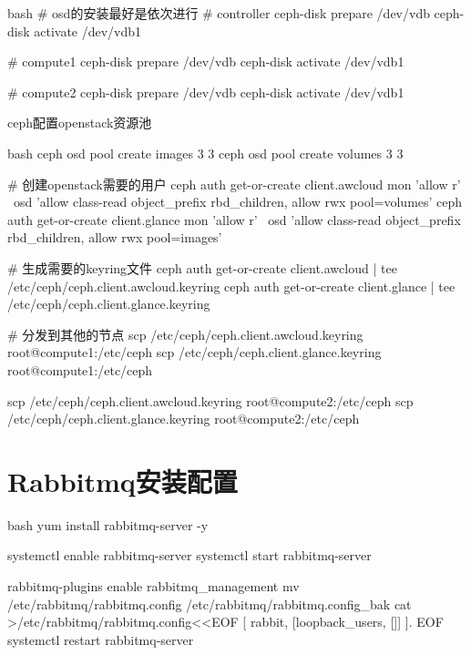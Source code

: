 \begin{outline}[enumerate]
\begin{code-in-enumerate}{bash}
# osd的安装最好是依次进行
# controller
ceph-disk prepare /dev/vdb
ceph-disk activate /dev/vdb1

# compute1
ceph-disk prepare /dev/vdb
ceph-disk activate /dev/vdb1

# compute2
ceph-disk prepare /dev/vdb
ceph-disk activate /dev/vdb1
\end{code-in-enumerate}

\1 ceph配置openstack资源池
\begin{code-in-enumerate}{bash}
ceph osd pool create images 3 3
ceph osd pool create volumes 3 3

# 创建openstack需要的用户
ceph auth get-or-create client.awcloud mon 'allow r' \
    osd 'allow class-read object_prefix rbd_children, allow rwx pool=volumes'
ceph auth get-or-create client.glance mon 'allow r' \
    osd 'allow class-read object_prefix rbd_children, allow rwx pool=images'

# 生成需要的keyring文件
ceph auth get-or-create client.awcloud | tee /etc/ceph/ceph.client.awcloud.keyring
ceph auth get-or-create client.glance | tee /etc/ceph/ceph.client.glance.keyring

# 分发到其他的节点
scp /etc/ceph/ceph.client.awcloud.keyring root@compute1:/etc/ceph
scp /etc/ceph/ceph.client.glance.keyring root@compute1:/etc/ceph

scp /etc/ceph/ceph.client.awcloud.keyring root@compute2:/etc/ceph
scp /etc/ceph/ceph.client.glance.keyring root@compute2:/etc/ceph
\end{code-in-enumerate}

\end{outline}

\section{Rabbitmq安装配置}
\begin{code-block}{bash}
yum install rabbitmq-server -y

systemctl enable rabbitmq-server
systemctl start rabbitmq-server

rabbitmq-plugins enable rabbitmq_management
mv /etc/rabbitmq/rabbitmq.config /etc/rabbitmq/rabbitmq.config_bak
cat >/etc/rabbitmq/rabbitmq.config<<EOF
[
{rabbit, [{loopback_users, []}]}
].
EOF
systemctl restart rabbitmq-server
\end{code-block}

